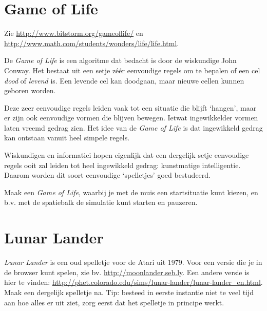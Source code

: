 \documentclass[a4paper,11pt]{article}
\begin{document}
\section{Game of Life}

Zie \url{http://www.bitstorm.org/gameoflife/} en \url{http://www.math.com/students/wonders/life/life.html}.

De \emph{Game of Life} is een algoritme dat bedacht is door de wiskundige John Conway.  Het bestaat uit een setje zéér eenvoudige regels om te bepalen of een cel \emph{dood} of \emph{levend} is.  Een levende cel kan doodgaan, maar nieuwe cellen kunnen geboren worden.

Deze zeer eenvoudige regels leiden vaak tot een situatie die blijft `hangen', maar er zijn ook eenvoudige vormen die blijven bewegen.  Ietwat ingewikkelder vormen laten vreemd gedrag zien.  Het idee van de \emph{Game of Life} is dat ingewikkeld gedrag kan ontstaan vanuit heel simpele regels.

Wiskundigen en informatici hopen eigenlijk dat een dergelijk setje eenvoudige regels ooit zal leiden tot heel ingewikkeld gedrag: kunstmatige intelligentie.  Daarom worden dit soort eenvoudige `spelletjes' goed bestudeerd.

Maak een \emph{Game of Life}, waarbij je met de muis een startsituatie kunt kiezen, en b.v. met de spatiebalk de simulatie kunt starten en pauzeren.


\section{Lunar Lander}

\emph{Lunar Lander} is een oud spelletje voor de Atari uit 1979.  Voor een versie die je in de browser kunt spelen, zie bv. \url{http://moonlander.seb.ly}.  Een andere versie is hier te vinden: \url{http://phet.colorado.edu/sims/lunar-lander/lunar-lander_en.html}.  Maak een dergelijk spelletje na.  Tip: besteed in eerste instantie niet te veel tijd aan hoe alles er uit ziet, zorg eerst dat het spelletje in principe werkt.
\end{document}
